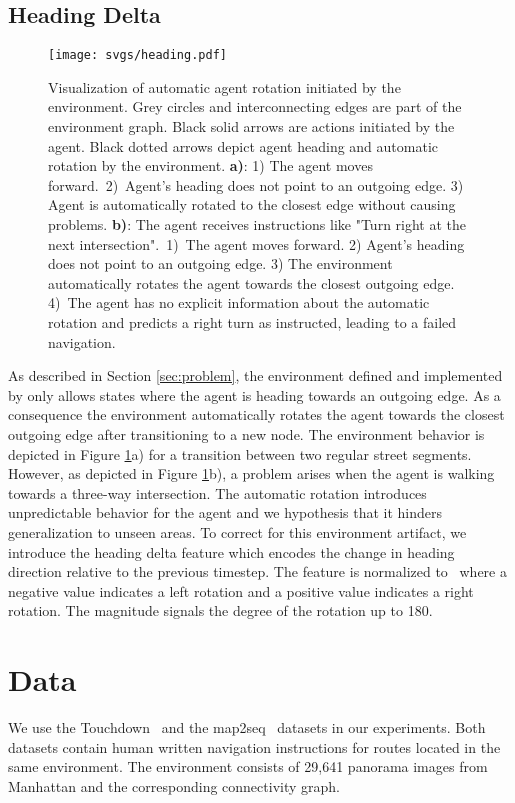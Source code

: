 \documentclass[11pt]{article}
\begin{document}
\subsection{Heading Delta}
\label{sec:heading}
\begin{figure}
\centering
  \texttt{[image: svgs/heading.pdf]}
  \caption{Visualization of automatic agent rotation initiated by the environment. Grey circles and interconnecting edges are part of the environment graph. Black solid arrows are actions initiated by the agent. Black dotted arrows depict agent heading and automatic rotation by the environment.
  \textbf{a)}: 1) The agent moves forward.~2)~Agent's heading does not point to an outgoing edge. 3) Agent is automatically rotated to the closest edge without causing problems.
  \textbf{b)}: The agent receives instructions like "Turn right at the next intersection".~1)~The agent moves forward. 2) Agent's heading does not point to an outgoing edge. 3) The environment automatically rotates the agent towards the closest outgoing edge. 4)~The agent has no explicit information about the automatic rotation and predicts a right turn as instructed, leading to a failed navigation.}
  \label{fig:heading}
\end{figure}
As described in Section \ref{sec:problem}, the environment defined and implemented by \citet{Chen2018Touchdown} only allows states where the agent is heading towards an outgoing edge. As a consequence the environment automatically rotates the agent towards the closest outgoing edge after transitioning to a new node. The environment behavior is depicted in Figure \ref{fig:heading}a) for a transition between two regular street segments. 
However, as depicted in Figure \ref{fig:heading}b), a problem arises when the agent is walking towards a three-way intersection. The automatic rotation introduces unpredictable behavior for the agent and we hypothesis that it hinders generalization to unseen areas. To correct for this environment artifact, we introduce the heading delta feature  which encodes the change in heading direction relative to the previous timestep. The feature is normalized to~ where a negative value indicates a left rotation and a positive value indicates a right rotation. The magnitude signals the degree of the rotation up to 180\degree.

\section{Data}
\label{sec:data}
We use the Touchdown~\cite{Chen2018Touchdown} and the map2seq~\cite{schumann-riezler-2021-map2seq} datasets in our experiments. Both datasets contain human written navigation instructions for routes located in the same environment. The environment consists of 29,641 panorama images from Manhattan and the corresponding connectivity graph.
\end{document}
